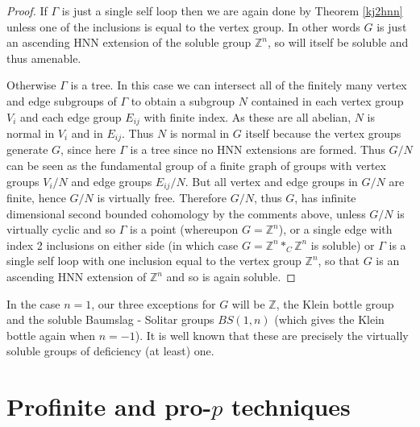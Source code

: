 \documentclass[11pt,reqno]{amsart}
\numberwithin{equation}{section}
\newcommand{\Z}{\mathbb{Z}}
\theoremstyle{definition}
\theoremstyle{remark}
\begin{document}
\begin{proof}
   If $\Gamma$ is just a single self loop then we are again done by
   Theorem \ref{kj2hnn} unless one of the inclusions is equal to the
   vertex group. In other words $G$ is just an ascending HNN extension
   of the soluble group $\Z^n$, so will itself be soluble and thus amenable.

   Otherwise $\Gamma$ is a tree. In this case we can intersect all of
   the finitely many vertex and edge subgroups of $\Gamma$ 
   to obtain a subgroup $N$ contained in each vertex group $V_i$ and
   each edge group $E_{ij}$ with finite index.
   As these are all abelian, $N$ is normal in $V_i$
   and in $E_{ij}$. Thus $N$ is
   normal in $G$ itself because the vertex groups generate $G$,
   since here $\Gamma$ is a tree since no HNN extensions are formed.
   Thus $G/N$ can be seen as the fundamental group of a finite graph of
   groups with
   vertex groups $V_i/N$ and edge groups $E_{ij}/N$. But all vertex and
   edge groups in $G/N$ are finite, hence $G/N$ is
   virtually free. Therefore $G/N$, thus $G$,
   has infinite dimensional second bounded
   cohomology by the comments above, unless $G/N$ is virtually
cyclic and so $\Gamma$ is a point (whereupon
   $G=\Z^n$), or a single edge with index 2 inclusions on either side
   (in which case $G=\Z^n*_C\Z^n$ is soluble) or $\Gamma$ is a single self
   loop with one inclusion equal to the vertex group $\Z^n$, so that $G$
   is an ascending HNN extension of $\Z^n$ and so is again soluble.
   \end{proof}

   In the case $n=1$, our three exceptions for $G$ will be $\Z$, the Klein
   bottle group and the soluble Baumslag - Solitar groups $BS(1,n)$ (which
   gives the Klein bottle again when $n=-1$). It is well known that these
   are precisely the virtually soluble groups of deficiency (at least) one.
    
    
   
\section{Profinite and pro-$p$ techniques}
\end{document}
